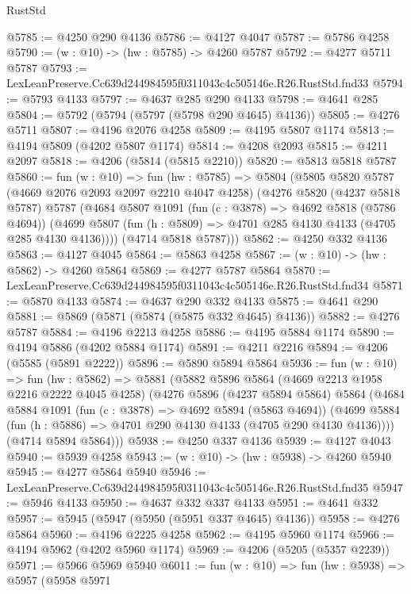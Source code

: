 \begin{lexlean}{RustStd}
\begin{coremodule}
@5785 := @4250 @290 @4136
@5786 := @4127 @4047
@5787 := @5786 @4258
@5790 := (w : @10) -> (hw : @5785) -> @4260 @5787
@5792 := @4277 @5711 @5787
@5793 := LexLeanPreserve.Cc639d244984595f0311043c4c505146e.R26.RustStd.fnd33
@5794 := @5793 @4133
@5797 := @4637 @285 @290 @4133
@5798 := @4641 @285
@5804 := @5792 (@5794 (@5797 (@5798 @290 @4645) @4136))
@5805 := @4276 @5711
@5807 := @4196 @2076 @4258
@5809 := @4195 @5807 @1174
@5813 := @4194 @5809 (@4202 @5807 @1174)
@5814 := @4208 @2093
@5815 := @4211 @2097
@5818 := @4206 (@5814 (@5815 @2210))
@5820 := @5813 @5818 @5787
@5860 := fun (w : @10) =>
  fun (hw : @5785) =>
  @5804
    (@5805
      @5820
      @5787
      (@4669 @2076 @2093 @2097 @2210 @4047 @4258)
      (@4276
        @5820
        (@4237 @5818 @5787)
        @5787
        (@4684
          @5807
          @1091
          (fun (c : @3878) => @4692 @5818 (@5786 @4694))
          (@4699 @5807 (fun (h : @5809) => @4701 @285 @4130 @4133 (@4705 @285 @4130 @4136))))
        (@4714 @5818 @5787)))
@5862 := @4250 @332 @4136
@5863 := @4127 @4045
@5864 := @5863 @4258
@5867 := (w : @10) -> (hw : @5862) -> @4260 @5864
@5869 := @4277 @5787 @5864
@5870 := LexLeanPreserve.Cc639d244984595f0311043c4c505146e.R26.RustStd.fnd34
@5871 := @5870 @4133
@5874 := @4637 @290 @332 @4133
@5875 := @4641 @290
@5881 := @5869 (@5871 (@5874 (@5875 @332 @4645) @4136))
@5882 := @4276 @5787
@5884 := @4196 @2213 @4258
@5886 := @4195 @5884 @1174
@5890 := @4194 @5886 (@4202 @5884 @1174)
@5891 := @4211 @2216
@5894 := @4206 (@5585 (@5891 @2222))
@5896 := @5890 @5894 @5864
@5936 := fun (w : @10) =>
  fun (hw : @5862) =>
  @5881
    (@5882
      @5896
      @5864
      (@4669 @2213 @1958 @2216 @2222 @4045 @4258)
      (@4276
        @5896
        (@4237 @5894 @5864)
        @5864
        (@4684
          @5884
          @1091
          (fun (c : @3878) => @4692 @5894 (@5863 @4694))
          (@4699 @5884 (fun (h : @5886) => @4701 @290 @4130 @4133 (@4705 @290 @4130 @4136))))
        (@4714 @5894 @5864)))
@5938 := @4250 @337 @4136
@5939 := @4127 @4043
@5940 := @5939 @4258
@5943 := (w : @10) -> (hw : @5938) -> @4260 @5940
@5945 := @4277 @5864 @5940
@5946 := LexLeanPreserve.Cc639d244984595f0311043c4c505146e.R26.RustStd.fnd35
@5947 := @5946 @4133
@5950 := @4637 @332 @337 @4133
@5951 := @4641 @332
@5957 := @5945 (@5947 (@5950 (@5951 @337 @4645) @4136))
@5958 := @4276 @5864
@5960 := @4196 @2225 @4258
@5962 := @4195 @5960 @1174
@5966 := @4194 @5962 (@4202 @5960 @1174)
@5969 := @4206 (@5205 (@5357 @2239))
@5971 := @5966 @5969 @5940
@6011 := fun (w : @10) =>
  fun (hw : @5938) =>
  @5957
    (@5958
      @5971

\end{coremodule}
\end{lexlean}

